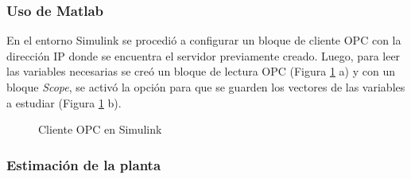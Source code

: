 \subsubsection{Uso de Matlab}
En el entorno Simulink se procedió a configurar un bloque de cliente OPC con la dirección IP donde se encuentra el servidor previamente creado. Luego, para leer las variables necesarias se creó un bloque de lectura OPC (Figura \ref{fig:opcsimu} a) y con un bloque \textit{Scope}, se activó la opción para que se guarden los vectores de las variables a estudiar (Figura \ref{fig:opcsimu} b). 


\begin{figure}[htbp]
	\centering
	\caption{Cliente OPC en Simulink} \label{fig:opcsimu}
\end{figure}



\subsubsection{Estimación de la planta}